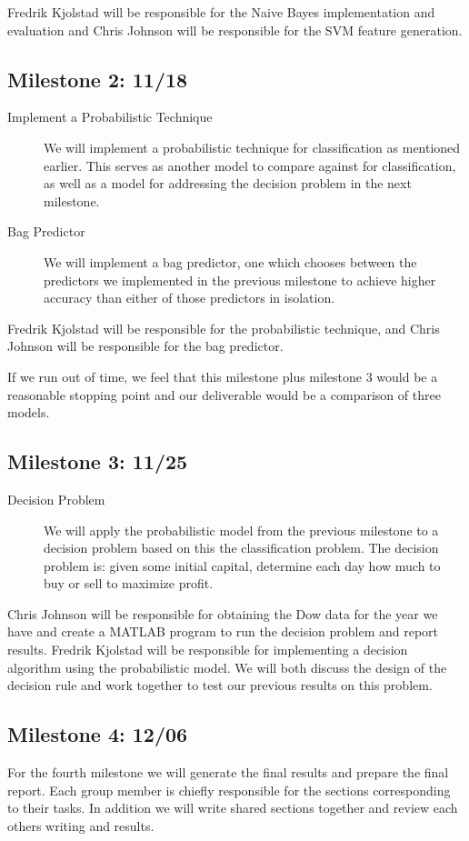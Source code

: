 \documentclass[10pt]{article}
\begin{document}
Fredrik Kjolstad will be responsible for the Naive Bayes implementation and evaluation and Chris Johnson will be responsible for the SVM feature generation.


\subsection{Milestone 2: 11/18}

\begin{description}
\item[Implement a Probabilistic Technique] We will implement a probabilistic technique for classification as mentioned earlier. This serves as another model to compare against for classification, as well as a model for addressing the decision problem in the next milestone.
\item[Bag Predictor] We will implement a bag predictor, one which chooses between the predictors we implemented in the previous milestone to achieve higher accuracy than either of those predictors in isolation. 
\end{description}

Fredrik Kjolstad will be responsible for the probabilistic technique, and Chris Johnson will be responsible for the bag predictor.

If we run out of time, we feel that this milestone plus milestone 3 would be a reasonable stopping point and our deliverable would be a comparison of three models.


\subsection{Milestone 3: 11/25}
\begin{description}
\item[Decision Problem] We will apply the probabilistic model from the previous milestone to a decision problem based on this the classification problem. The decision problem is: given some initial capital, determine each day how much to buy or sell to maximize profit.
\end{description}

Chris Johnson will be responsible for obtaining the Dow data for the year we have and create a MATLAB program to run the decision problem and report results.
Fredrik Kjolstad will be responsible for implementing a decision algorithm using the probabilistic model.
We will both discuss the design of the decision rule and work together to test our previous results on this problem.

\subsection{Milestone 4: 12/06}
For the fourth milestone we will generate the final results and prepare the final report. Each group member is chiefly responsible for the sections corresponding to their tasks. In addition we will write shared sections together and review each others writing and results.
\end{document}
